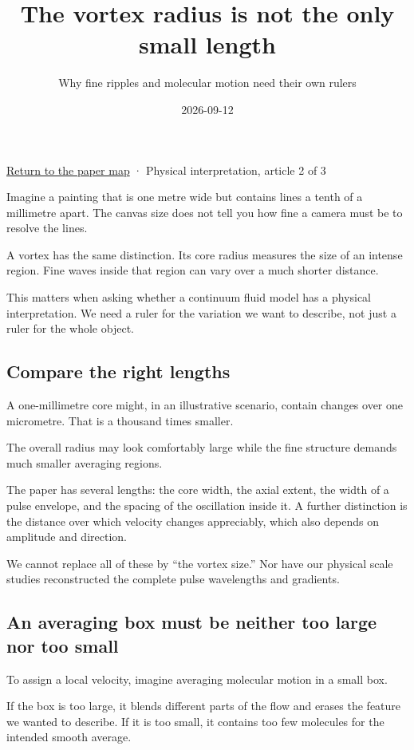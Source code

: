 \documentclass[
  english,
  11pt,
]{article}
\title{The vortex radius is not the only small length}
\subtitle{Why fine ripples and molecular motion need their own rulers}
\author{}
\date{2026-09-12}
\begin{document}
\maketitle


\href{../paper-map/article.html}{Return to the paper map} · Physical
interpretation, article 2 of 3

Imagine a painting that is one metre wide but contains lines a tenth of
a millimetre apart. The canvas size does not tell you how fine a camera
must be to resolve the lines.

A vortex has the same distinction. Its core radius measures the size of
an intense region. Fine waves inside that region can vary over a much
shorter distance.

This matters when asking whether a continuum fluid model has a physical
interpretation. We need a ruler for the variation we want to describe,
not just a ruler for the whole object.

\subsection{Compare the right lengths}\label{compare-the-right-lengths}

A one-millimetre core might, in an illustrative scenario, contain
changes over one micrometre. That is a thousand times smaller.

The overall radius may look comfortably large while the fine structure
demands much smaller averaging regions.

The paper has several lengths: the core width, the axial extent, the
width of a pulse envelope, and the spacing of the oscillation inside it.
A further distinction is the distance over which velocity changes
appreciably, which also depends on amplitude and direction.

We cannot replace all of these by ``the vortex size.'' Nor have our
physical scale studies reconstructed the complete pulse wavelengths and
gradients.

\subsection{An averaging box must be neither too large nor too
small}\label{an-averaging-box-must-be-neither-too-large-nor-too-small}

To assign a local velocity, imagine averaging molecular motion in a
small box.

If the box is too large, it blends different parts of the flow and
erases the feature we wanted to describe. If it is too small, it
contains too few molecules for the intended smooth average.
\end{document}
